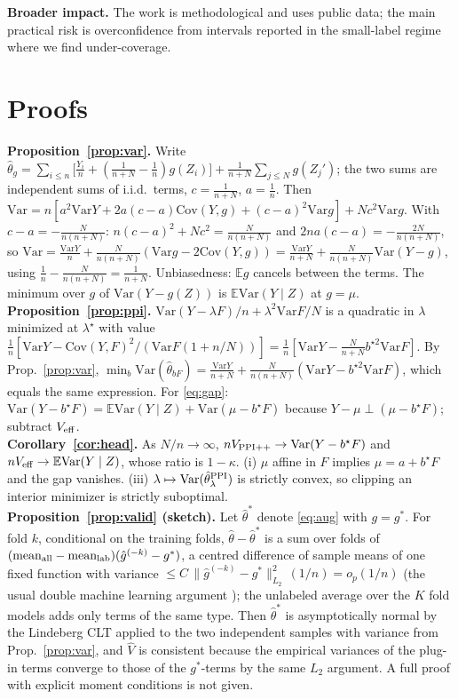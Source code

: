 \documentclass{article}
\newcommand{\E}{\mathbb{E}}
\newcommand{\Var}{\mathrm{Var}}
\newcommand{\Cov}{\mathrm{Cov}}
\begin{document}
\textbf{Broader impact.} The work is methodological and uses public data; the main practical risk is overconfidence from intervals reported in the small-label regime where we find under-coverage.




\appendix
\section{Proofs}\label{app:proofs}
\textbf{Proposition~\ref{prop:var}.} Write $\hat\theta_g=\sum_{i\le n}\big[\tfrac{Y_i}{n}+(\tfrac1{n+N}-\tfrac1n)g(Z_i)\big]+\tfrac1{n+N}\sum_{j\le N}g(Z_j')$; the two sums are independent sums of i.i.d.\ terms, $c=\tfrac1{n+N}$, $a=\tfrac1n$. Then $\Var=n[a^2\Var Y+2a(c-a)\Cov(Y,g)+(c-a)^2\Var g]+Nc^2\Var g$. With $c-a=-\tfrac N{n(n+N)}$: $n(c-a)^2+Nc^2=\tfrac N{n(n+N)}$ and $2na(c-a)=-\tfrac{2N}{n(n+N)}$, so $\Var=\tfrac{\Var Y}n+\tfrac N{n(n+N)}(\Var g-2\Cov(Y,g))=\tfrac{\Var Y}{n+N}+\tfrac N{n(n+N)}\Var(Y-g)$, using $\tfrac1n-\tfrac N{n(n+N)}=\tfrac1{n+N}$. Unbiasedness: $\E g$ cancels between the terms. The minimum over $g$ of $\Var(Y-g(Z))$ is $\E\Var(Y\mid Z)$ at $g=\mu$.\\
\textbf{Proposition~\ref{prop:ppi}.} $\Var(Y-\lambda F)/n+\lambda^2\Var F/N$ is a quadratic in $\lambda$ minimized at $\lambda^\star$ with value $\frac1n[\Var Y-\Cov(Y,F)^2/(\Var F(1+n/N))]=\frac1n[\Var Y-\tfrac{N}{n+N}b^{\star2}\Var F]$. By Prop.~\ref{prop:var}, $\min_b\Var(\hat\theta_{bF})=\frac{\Var Y}{n+N}+\frac N{n(n+N)}(\Var Y-b^{\star2}\Var F)$, which equals the same expression. For \eqref{eq:gap}: $\Var(Y-b^\star F)=\E\Var(Y\mid Z)+\Var(\mu-b^\star F)$ because $Y-\mu\perp(\mu-b^\star F)$; subtract $V_{\rm eff}$.\\
\textbf{Corollary~\ref{cor:head}.} As $N/n\to\infty$, $nV_{\rm PPI++}\to\Var(Y-b^\star F)$ and $nV_{\rm eff}\to\E\Var(Y\mid Z)$, whose ratio is $1-\kappa$. (i) $\mu$ affine in $F$ implies $\mu=a+b^\star F$ and the gap vanishes. (iii) $\lambda\mapsto\Var(\hat\theta^{\rm PPI}_\lambda)$ is strictly convex, so clipping an interior minimizer is strictly suboptimal.\\
\textbf{Proposition~\ref{prop:valid} (sketch).} Let $\hat\theta^\ast$ denote \eqref{eq:aug} with $g=g^\ast$. For fold $k$, conditional on the training folds, $\hat\theta-\hat\theta^\ast$ is a sum over folds of $(\text{mean}_{\rm all}-\text{mean}_{\rm lab})(\hat g^{(-k)}-g^\ast)$, a centred difference of sample means of one fixed function with variance $\le C\,\|\hat g^{(-k)}-g^\ast\|^2_{L_2}\,(1/n)=o_p(1/n)$ (the usual double machine learning argument \citep{chernozhukov2018dml}); the unlabeled average over the $K$ fold models adds only terms of the same type. Then $\hat\theta^\ast$ is asymptotically normal by the Lindeberg CLT applied to the two independent samples with variance from Prop.~\ref{prop:var}, and $\hat V$ is consistent because the empirical variances of the plug-in terms converge to those of the $g^\ast$-terms by the same $L_2$ argument. A full proof with explicit moment conditions is not given.
\end{document}
